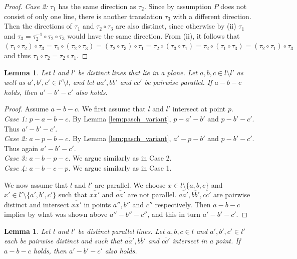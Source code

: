 \documentclass[11pt,a4paper]{article}
\newcommand{\betw}[3]{#1 - #2 - #3}
\newcommand{\lineab}[1]{\overline{#1}}
\newtheorem{lemma}[theorem]{Lemma}
\begin{document}
\begin{proof}
\textit{Case 2:} $\tau_1$ has the same direction as $\tau_2$. Since by assumption $P$ does not consist of only one line, there is another translation $\tau_3$ with a different direction. Then the directions of $\tau_1$ and $\tau_2 \circ \tau_3$ are also distinct, since otherwise by (ii) $\tau_1$ and $\tau_3 = \tau_2^{-1} \circ \tau_2 \circ \tau_3$ would have the same direction. From (ii), it follows that $(\tau_1 \circ \tau_2) \circ \tau_3 = \tau_1 \circ (\tau_2 \circ \tau_3) = (\tau_2 \circ \tau_3) \circ \tau_1 = \tau_2 \circ (\tau_3 \circ \tau_1) = \tau_2 \circ (\tau_1 \circ \tau_3) = (\tau_2 \circ \tau_1) \circ \tau_3$ and thus $\tau_1 \circ \tau_2 = \tau_2 \circ \tau_1$.
\end{proof}

\begin{lemma} \label{lem:between_parallel_transport1}
Let $l$ and $l'$ be distinct lines that lie in a plane. Let $a, b, c \in l \setminus l'$ as well as $a', b', c' \in l' \setminus l$, and let $\lineab{aa'}, \lineab{bb'}$ and $\lineab{cc'}$ be pairwise parallel. If $\betw{a}{b}{c}$ holds, then $\betw{a'}{b'}{c'}$ also holds.
\end{lemma}

\begin{proof}
Assume $\betw{a}{b}{c}$. We first assume that $l$ and $l'$ intersect at point $p$. \\
\textit{Case 1:} $\betw{p}{a}{b} - c$. By Lemma \ref{lem:pasch_variant}, $\betw{p}{a'}{b'}$ and $\betw{p}{b'}{c'}$. Thus $\betw{a'}{b'}{c'}$. \\
\textit{Case 2:} $\betw{a}{p}{b} - c$. By Lemma \ref{lem:pasch_variant}, $\betw{a'}{p}{b'}$ and $\betw{p}{b'}{c'}$. Thus again $\betw{a'}{b'}{c'}$. \\
\textit{Case 3:} $\betw{a}{b}{p} - c$. We argue similarly as in Case 2. \\
\textit{Case 4:} $\betw{a}{b}{c} - p$. We argue similarly as in Case 1.

We now assume that $l$ and $l'$ are parallel. We choose $x \in l \setminus \{a, b, c\}$ and $x' \in l' \setminus \{a', b', c'\}$ such that $\lineab{xx'}$ and $\lineab{aa'}$ are not parallel. $\lineab{aa'}, \lineab{bb'}, \lineab{cc'}$ are pairwise distinct and intersect $\lineab{xx'}$ in points $a'', b''$ and $c''$ respectively. Then $\betw{a}{b}{c}$ implies by what was shown above $\betw{a''}{b''}{c''}$, and this in turn $\betw{a'}{b'}{c'}$.
\end{proof}

\begin{lemma} \label{lem:between_parallel_transport2}
Let $l$ and $l'$ be distinct parallel lines. Let $a, b, c \in l$ and $a', b', c' \in l'$ each be pairwise distinct and such that $\lineab{aa'}, \lineab{bb'}$ and $\lineab{cc'}$ intersect in a point. If $\betw{a}{b}{c}$ holds, then $\betw{a'}{b'}{c'}$ also holds.
\end{lemma}
\end{document}
